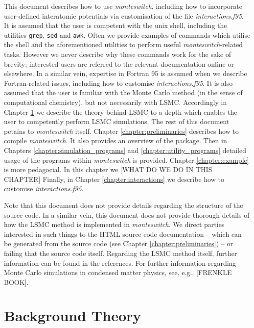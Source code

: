 \documentclass{report}
\begin{document}
This document describes how to use \emph{monteswitch}, including how to incorporate user-defined interatomic potentials via customisation
of the file \emph{interactions.f95}.
It is assumed that the user is competent with the unix shell, including the utilities \texttt{grep}, \texttt{sed} and \texttt{awk}.
Often we provide examples of commands which utilise the shell and the aforementioned utilities to perform useful \emph{monteswitch}-related tasks.
However we never describe why these commands work for the sake of brevity; interested users are referred to the relevant documentation online
or elsewhere. In a similar vein, expertise in Fortran 95 is assumed when we describe Fortran-related issues, including how to customise
\emph{interactions.f95}. It is also assumed that the user is familiar with the Monte Carlo method (in the sense of computational
chemistry), but not necessarily with LSMC. Accordingly in Chapter \ref{chapter:background} we describe the theory behind LSMC to a depth 
which enables the user to competently perform LSMC simulations. The rest of this document petains to \emph{monteswitch} itself. Chapter
\ref{chapter:preliminaries} describes how to compile \emph{monteswitch}. It also provides an overview of the package. Then in Chapters
\ref{chapter:simulation_programs} and \ref{chapter:utility_programs} detailed usage of the programs within \emph{monteswitch} is provided.
Chapter \ref{chapter:example} is more pedagocial. In this chapter we [WHAT DO WE DO IN THIS CHAPTER]
Finally, in Chapter \ref{chapter:interactions} we describe how to customise \emph{interactions.f95}.

Note that this document does not provide details regarding the structure of the source code. In a similar vein, 
this document does not provide thorough details of how the LSMC method is implemented in \emph{monteswitch}. We direct parties 
interested in such things to the HTML source code documentation -- which can be generated from the source code (see Chapter
\ref{chapter:preliminaries}) -- or failing that the source code itself.
Regarding the LSMC method itself, further information can be found in the references. For further 
information regarding Monte Carlo simulations in condensed matter physics, see, e.g., [FRENKLE BOOK].


\chapter{Background Theory}\label{chapter:background}
\end{document}
